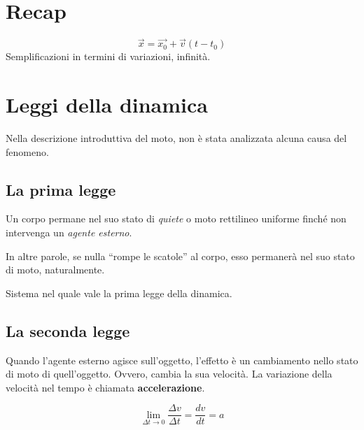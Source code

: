 \marginpar{\minitoc}

\section{Recap}
\[ \overrightarrow{x} = \overrightarrow{x_0} + \overrightarrow{v}(t - t_0) \]
Semplificazioni in termini di variazioni, infinità.

\section{Leggi della dinamica}

Nella descrizione introduttiva del moto, non è stata analizzata alcuna causa del
fenomeno.

\subsection{La prima legge}

\vspace{8pt}
\begin{tcolorbox}[colback = red!30, colframe = red!30!black, title = {Prima legge della dinamica (legge di inerzia)}]
    Un corpo permane nel suo stato di \textit{quiete} o moto rettilineo uniforme
    finché non intervenga un \textit{agente esterno}.
\end{tcolorbox}
\vspace{5pt}

In altre parole, se nulla ``rompe le scatole'' al corpo, esso permanerà nel suo
stato di moto, naturalmente.

\vspace{8pt}
\begin{tcolorbox}[colback = yellow!30, colframe = yellow!30!black, title = {Sistema inerziale}]
    Sistema nel quale vale la prima legge della dinamica.
\end{tcolorbox}
\vspace{5pt}

\subsection{La seconda legge}
Quando l'agente esterno agisce sull'oggetto, l'effetto è un cambiamento nello
stato di moto di quell'oggetto. Ovvero, cambia la sua velocità. La variazione
della velocità nel tempo è chiamata \textbf{accelerazione}.

\[ \lim_{\Delta t \to 0} \frac{\Delta v}{\Delta t} = \frac{dv}{dt} = a \]

